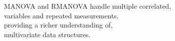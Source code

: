 \documentclass[preview]{standalone}
\begin{document}
\begin{center}
MANOVA and RMANOVA handle multiple correlated,\\variables and repeated measurements,\\providing a richer understanding of,\\multivariate data structures.
\end{center}
\end{document}
